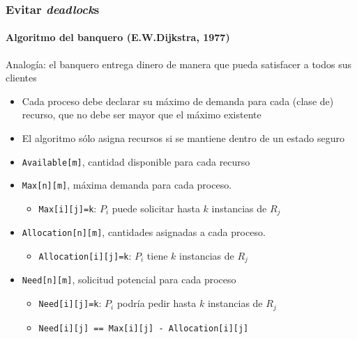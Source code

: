 \documentclass[letter]{beamer}
\begin{document}
\begin{frame}
  \frametitle{Evitar {\em deadlock}s}
  \framesubtitle{Algoritmo del banquero (E.W.Dijkstra, 1977)}

  Analogía: el banquero entrega dinero de manera que pueda satisfacer a todos sus clientes
  
  \begin{itemize}
    \item<2-> Cada proceso debe declarar su máximo de demanda para cada (clase de) recurso,
             que no debe ser mayor que el máximo existente
    \item<3-> El algoritmo sólo asigna recursos si se mantiene dentro de un estado seguro
  \end{itemize}
  
  \begin{itemize}
    \item<5-> {\tt Available[m]}, cantidad disponible para cada recurso
    \item<5-> {\tt Max[n][m]}, máxima demanda para cada proceso.
      \begin{itemize}
        \item {\tt Max[i][j]=k}: $P_i$ puede solicitar hasta $k$ instancias de $R_j$
      \end{itemize}
    \item<5-> {\tt Allocation[n][m]}, cantidades asignadas a cada proceso.
      \begin{itemize}
        \item {\tt Allocation[i][j]=k}: $P_i$ tiene $k$ instancias de $R_j$
      \end{itemize}
    \item<5-> {\tt Need[n][m]}, solicitud potencial para cada proceso
      \begin{itemize}
        \item {\tt Need[i][j]=k}: $P_i$ podría pedir hasta $k$ instancias de $R_j$
        \item {\tt Need[i][j] == Max[i][j] - Allocation[i][j]}
      \end{itemize}
  \end{itemize}
  
  
\end{frame}
\end{document}
